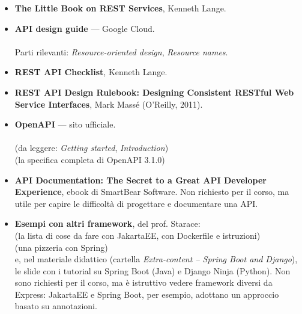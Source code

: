 \begin{itemize}
  \item \textbf{The Little Book on REST Services}, Kenneth Lange. \\
  \item \textbf{API design guide} --- Google Cloud. \\
         \\
        Parti rilevanti: \textit{Resource-oriented design}, \textit{Resource
        names}.
  \item \textbf{REST API Checklist}, Kenneth Lange. \\
  \item \textbf{REST API Design Rulebook: Designing Consistent RESTful Web
        Service Interfaces}, Mark Massé (O'Reilly, 2011).
  \item \textbf{OpenAPI} --- sito ufficiale. \\
         \\
         (da leggere: \textit{Getting
        started}, \textit{Introduction}) \\
         (la specifica completa di
        OpenAPI 3.1.0)
  \item \textbf{API Documentation: The Secret to a Great API Developer
        Experience}, ebook di SmartBear Software. Non richiesto per il corso,
        ma utile per capire le difficoltà di progettare e documentare una API. \\
  \item \textbf{Esempi con altri framework}, del prof. Starace: \\
         (la lista di
        cose da fare con JakartaEE, con Dockerfile e istruzioni) \\
         (una pizzeria
        con Spring) \\
        e, nel materiale didattico (cartella \textit{Extra-content -- Spring
        Boot and Django}), le slide con i tutorial su Spring Boot (Java) e
        Django Ninja (Python). Non sono richiesti per il corso, ma è
        istruttivo vedere framework diversi da Express: JakartaEE e Spring
        Boot, per esempio, adottano un approccio basato su annotazioni.
\end{itemize}
